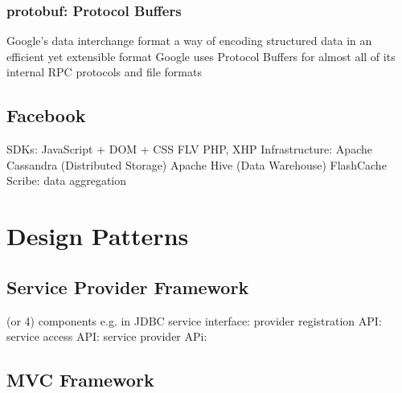 \documentclass{myproc}
\begin{document}
\subsubsection{protobuf: Protocol Buffers}
\bit
\w Google's data interchange format
\w a way of encoding structured data in an efficient yet extensible format
\w Google uses Protocol Buffers for almost all of its internal RPC protocols
and file formats
\eit
\subsection{Facebook}
\bit
\w SDKs: 
  \bit
  \w JavaScript + DOM + CSS
  \w FLV
  \w PHP, XHP
  \eit
\w Infrastructure:
  \bit
  \w Apache Cassandra (Distributed Storage)
  \w Apache Hive (Data Warehouse)
  \w FlashCache 
  \w Scribe: data aggregation
  \eit
\eit

\section{Design Patterns}
\subsection{Service Provider Framework}
\bit
{} (or 4) components
  \bit
  \w {}
  \w {}
  \w {}
  \w {}
  \eit
\w e.g. in JDBC
  \bit
  \w service interface: 
  \w provider registration API: 
  \w service access API: 
  \w service provider APi: 
  \eit
\eit
\subsection{MVC Framework}
\end{document}
